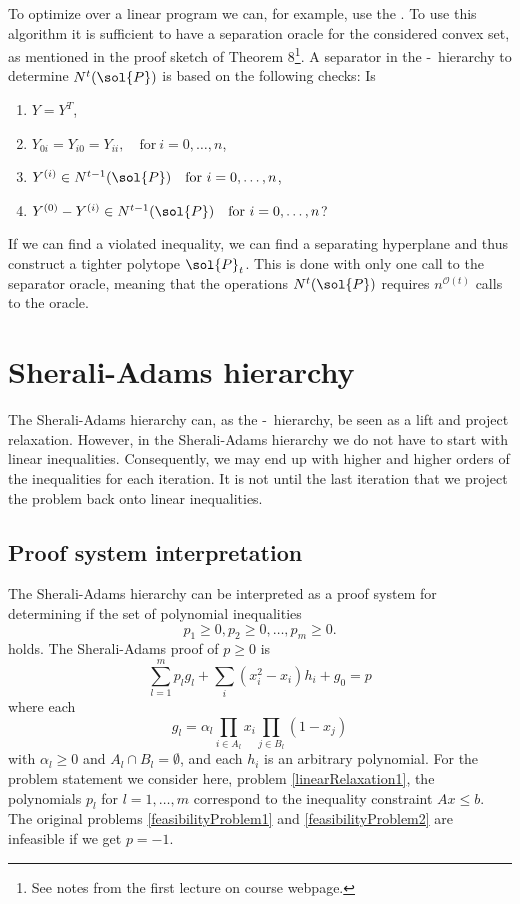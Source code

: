 \documentclass[a4paper,twoside,justified]{tufte-handout}
\begin{document}
To optimize over a linear program we can, for example, use the . To use this algorithm it is sufficient to have a separation oracle for the considered convex set, as mentioned in the proof sketch of Theorem 8\footnote{See notes from the first lecture on course webpage.}. A separator in the \Lovasz-\Schrijver\ hierarchy to determine $N^t(\sol{P})$ is based on the following checks: Is
\begin{enumerate}
\item $Y=Y^T$,
\item $Y_{0i}=Y_{i0}=Y_{ii}, \quad\text{for}\ i=0,\ldots,n$,
\item $Y^{(i)}\in N^{t-1}(\sol{P}) \quad\text{for}\ i=0,\ldots,n$,
\item $Y^{(0)}-Y^{(i)}\in N^{t-1}(\sol{P}) \quad\text{for}\ i=0,\ldots,n$?
\end{enumerate}
If we can find a violated inequality, we can find a separating hyperplane and thus construct a tighter polytope $\sol{P}_t$. This is done with only one call to the separator oracle, meaning that the operations $N^t(\sol{P})$ requires $n^{\mathcal{O}(t)}$ calls to the oracle. 

\section{Sherali-Adams hierarchy}
The Sherali-Adams hierarchy can, as the \Lovasz-\Schrijver\ hierarchy, be seen as a lift and project relaxation. However, in the Sherali-Adams hierarchy we do not have to start with linear inequalities. Consequently, we may end up with higher and higher orders of the inequalities for each iteration. It is not until the last iteration that we project the problem back onto linear inequalities. 

\subsection{Proof system interpretation}
The Sherali-Adams hierarchy can be interpreted as a proof system for determining if the set of polynomial inequalities 
\begin{equation}
  p_{1}\geq 0 , p_{2}\geq 0, \ldots , p_{m} \geq 0. 
\end{equation}
holds. The Sherali-Adams proof of $p\geq 0$ is
\begin{equation}
 \sum_{l=1}^m p_{l} g_{l} + \sum_{i} (x^{2}_{i} -x_{i}) h_{i}
 + g_{0}= p
\end{equation}
where each 
\begin{equation}
  g_{l} = \alpha_{l} \prod_{i\in A_{l}} x_{i} \prod_{j \in
    B_{l}}(1-x_{j})  
\end{equation}
with $ \alpha_{l}\geq 0 $ and $ A_{l} \cap B_{l}=\emptyset $, and each $ h_{i} $ is an arbitrary polynomial. For the problem statement we consider here, problem \eqref{linearRelaxation1}, the polynomials $p_l$ for $l=1,\ldots,m$ correspond to the inequality constraint $Ax\leq b$. The original problems \eqref{feasibilityProblem1} and \eqref{feasibilityProblem2} are infeasible if we get $p=-1$.
\end{document}
